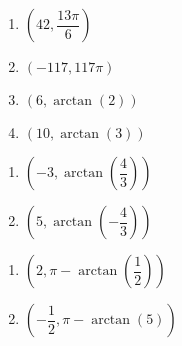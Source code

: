 \documentclass{ximera}
\begin{document}
\begin{multicols}{4} 

\begin{enumerate}

\setcounter{enumi}{\value{HW}}

\item $\left( 42, \dfrac{13\pi}{6} \right)$
\item $\left( -117, 117\pi \right)$ 
\item $\left( 6, \arctan(2) \right)$ 
\item $\left(10, \arctan(3) \right)$ 

\setcounter{HW}{\value{enumi}}

\end{enumerate}

\end{multicols}

\begin{multicols}{2} 

\begin{enumerate}

\setcounter{enumi}{\value{HW}}

\item $\left( -3, \arctan\left(\dfrac{4}{3}\right) \right)$ 
\item $\left( 5, \arctan\left(-\dfrac{4}{3}\right) \right)$ 

\setcounter{HW}{\value{enumi}}

\end{enumerate}

\end{multicols}

\begin{multicols}{2} 

\begin{enumerate}

\setcounter{enumi}{\value{HW}}

\item $\left( 2, \pi - \arctan\left(\dfrac{1}{2}\right)  \right)$ 
\item $\left( -\dfrac{1}{2}, \pi - \arctan\left(5\right)  \right)$ 

\setcounter{HW}{\value{enumi}}

\end{enumerate}

\end{multicols}
\end{document}
